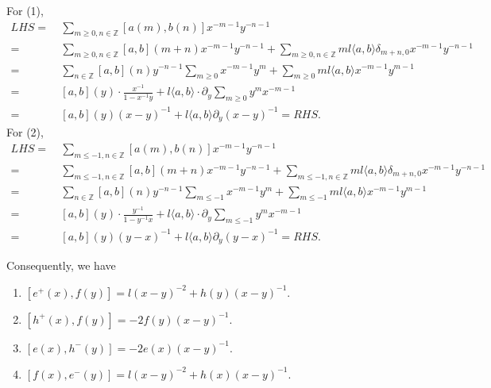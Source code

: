 \documentclass[11pt,oneside,reqno]{amsart}
\theoremstyle{definition}
\newcommand{\Z}{{\mathbb Z}}
\begin{document}
For (1), 
\begin{align*}
    LHS = \ & \sum_{m\geq 0, n\in \Z} [a(m),b(n)]x^{-m-1}y^{-n-1} \\
    = \ & \sum_{m\geq 0, n\in \Z} [a,b](m+n) x^{-m-1}y^{-n-1} + \sum_{m\geq 0, n\in \Z} m l \langle a, b\rangle \delta_{m+n, 0}x^{-m-1} y^{-n-1}\\
    = \ & \sum_{n\in \Z} [a,b](n)y^{-n-1}\sum_{m\geq 0} x^{-m-1}y^m + \sum_{m\geq 0} m l \langle a, b\rangle x^{-m-1}y^{m-1} \\
    = \ & [a,b](y) \cdot \frac{x^{-1}}{1-x^{-1}y} + l \langle a, b \rangle \cdot \partial_{y} \sum_{m\geq 0} y^m x^{-m-1} \\
    = \ & [a,b](y) (x-y)^{-1} + l\langle a, b\rangle \partial_y (x-y)^{-1} = RHS. 
\end{align*}
For (2), 
\begin{align*}
    LHS = \ & \sum_{m \leq -1, n\in \Z} [a(m),b(n)]x^{-m-1}y^{-n-1} \\
    = \ & \sum_{m \leq -1, n\in \Z} [a,b](m+n) x^{-m-1}y^{-n-1} + \sum_{m \leq -1, n\in \Z} m l \langle a, b\rangle \delta_{m+n, 0}x^{-m-1} y^{-n-1}\\
    = \ & \sum_{n\in \Z} [a,b](n)y^{-n-1}\sum_{m \leq -1} x^{-m-1}y^m + \sum_{m\leq -1} m l \langle a, b\rangle x^{-m-1}y^{m-1} \\
    = \ & [a,b](y) \cdot \frac{y^{-1}}{1-y^{-1}x} + l \langle a, b \rangle \cdot \partial_{y} \sum_{m \leq -1} y^m x^{-m-1} \\
    = \ & [a,b](y) (y-x)^{-1} + l\langle a, b\rangle \partial_y (y-x)^{-1} = RHS. 
\end{align*}

Consequently, we have
\begin{enumerate}
    \item $[e^+(x), f(y)] = l (x-y)^{-2} + h(y) (x-y)^{-1}. $
    \item $[h^+(x), f(y)] = -2f(y) (x-y)^{-1}.$
    \item $[e(x), h^-(y)] = -2e(x) (x-y)^{-1}.$
    \item $[f(x), e^-(y)] = l (x-y)^{-2} + h(x) (x-y)^{-1}.$
\end{enumerate}
\end{document}
